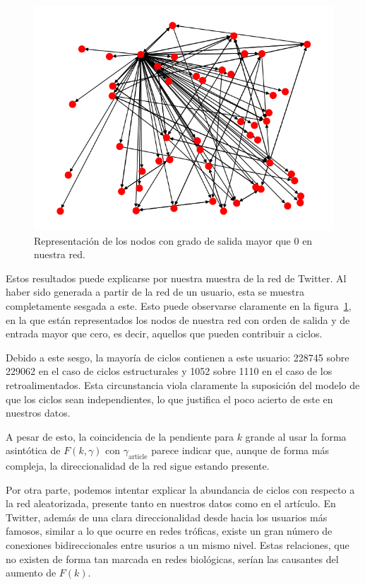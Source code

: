 \documentclass[1p]{elsarticle}
\begin{document}
\begin{figure}
    \centering
    \includegraphics[width=0.5\paperwidth]{graph_sevaseviene.png}
    \caption{Representación de los nodos con grado de salida mayor que 0 en nuestra red.}
    \label{fig:sevaseviene_network}
\end{figure}

    Estos resultados puede explicarse por nuestra muestra de la red de Twitter.
    Al haber sido generada a partir de la red de un usuario, esta se muestra completamente sesgada a este.
    Esto puede observarse claramente en la figura~\ref{fig:sevaseviene_network}, en la que están representados los nodos de nuestra red con orden de salida y de entrada mayor que cero, es decir, aquellos que pueden contribuir a ciclos.
    
    Debido a este sesgo, la mayoría de ciclos contienen a este usuario: 228745 sobre 229062 en el caso de ciclos estructurales y 1052 sobre 1110 en el caso de los retroalimentados.
    Esta circunstancia viola claramente la suposición del modelo de que los ciclos sean independientes, lo que justifica el poco acierto de este en nuestros datos.

    A pesar de esto, la coincidencia de la pendiente para $k$ grande al usar la forma asintótica de $F(k, \gamma)$ con $\gamma_{\textrm{article}}$ parece indicar que, aunque de forma más compleja, la direccionalidad de la red sigue estando presente.

    Por otra parte, podemos intentar explicar la abundancia de ciclos con respecto a la red aleatorizada, presente tanto en nuestros datos como en el artículo.
    En Twitter, además de una clara direccionalidad desde hacia los usuarios más famosos, similar a lo que ocurre en redes tróficas, existe un gran número de conexiones bidireccionales entre usurios a un mismo nivel. Estas relaciones, que no existen de forma tan marcada en redes biológicas, serían las causantes del aumento de $F(k)$.
\end{document}
